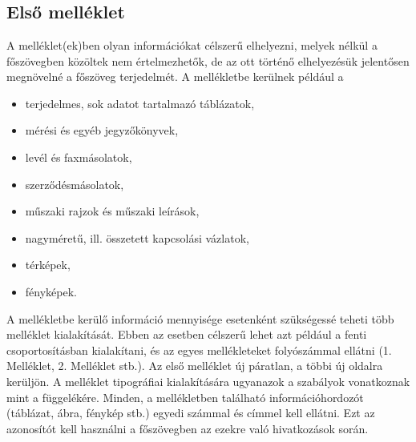 \appendix
\chapter*{\melleklet}
\setcounter{chapter}{13} %
\setcounter{section}{0}

\section{Első melléklet}

A melléklet(ek)ben olyan információkat célszerű elhelyezni, melyek nélkül a 
főszövegben közöltek nem értelmezhetők, de az ott történő elhelyezésük 
jelentősen megnövelné a főszöveg terjedelmét. A mellékletbe kerülnek például a

\begin{itemize}
  \item terjedelmes, sok adatot tartalmazó táblázatok,
  \item mérési és egyéb jegyzőkönyvek,
  \item levél és faxmásolatok,
  \item szerződésmásolatok,
  \item műszaki rajzok és műszaki leírások,
  \item nagyméretű, ill. összetett kapcsolási vázlatok,
  \item térképek,
  \item fényképek. 
\end{itemize}

A mellékletbe kerülő információ mennyisége esetenként szükségessé teheti több 
melléklet kialakítását. Ebben az esetben célszerű lehet azt például a fenti 
csoportosításban kialakítani, és az egyes mellékleteket folyószámmal ellátni 
(1. Melléklet, 2. Melléklet stb.). 
Az első melléklet új páratlan, a többi új oldalra kerüljön. 
A melléklet tipográfiai kialakítására ugyanazok a szabályok vonatkoznak mint a 
függelékére. 
Minden, a mellékletben található információhordozót (táblázat, ábra, 
fénykép stb.) egyedi számmal és címmel kell ellátni. Ezt az azonosítót kell 
használni a főszövegben az ezekre való hivatkozások során.

